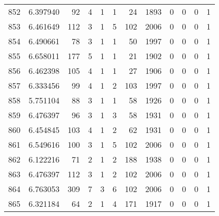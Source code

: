 \begin{tabular}{lrrrrrrrrrrr}
852 &  6.397940 &   92 &      4 &        1 &      1 &              24 &  1893 &               0 &               0 &               0 &               1 \\
853 &  6.461649 &  112 &      3 &        1 &      5 &             102 &  2006 &               0 &               0 &               0 &               1 \\
854 &  6.490661 &   78 &      3 &        1 &      1 &              50 &  1997 &               0 &               0 &               0 &               1 \\
855 &  6.658011 &  177 &      5 &        1 &      1 &              21 &  1902 &               0 &               0 &               0 &               1 \\
856 &  6.462398 &  105 &      4 &        1 &      1 &              27 &  1906 &               0 &               0 &               0 &               1 \\
857 &  6.333456 &   99 &      4 &        1 &      2 &             103 &  1997 &               0 &               0 &               0 &               1 \\
858 &  5.751104 &   88 &      3 &        1 &      1 &              58 &  1926 &               0 &               0 &               0 &               1 \\
859 &  6.476397 &   96 &      3 &        1 &      3 &              58 &  1931 &               0 &               0 &               0 &               1 \\
860 &  6.454845 &  103 &      4 &        1 &      2 &              62 &  1931 &               0 &               0 &               0 &               1 \\
861 &  6.549616 &  100 &      3 &        1 &      5 &             102 &  2006 &               0 &               0 &               0 &               1 \\
862 &  6.122216 &   71 &      2 &        1 &      2 &             188 &  1938 &               0 &               0 &               0 &               1 \\
863 &  6.476397 &  112 &      3 &        1 &      2 &             102 &  2006 &               0 &               0 &               0 &               1 \\
864 &  6.763053 &  309 &      7 &        3 &      6 &             102 &  2006 &               0 &               0 &               0 &               1 \\
865 &  6.321184 &   64 &      2 &        1 &      4 &             171 &  1917 &               0 &               0 &               0 &               1 \\

\end{tabular}
